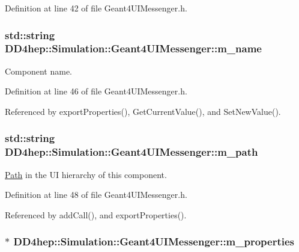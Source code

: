 Definition at line 42 of file Geant4UIMessenger.h.\hypertarget{class_d_d4hep_1_1_simulation_1_1_geant4_u_i_messenger_ab6322440ddac03e9b62f5560c7d11dbf}{
\subsubsection[{m\_\-name}]{\setlength{\rightskip}{0pt plus 5cm}std::string {\bf DD4hep::Simulation::Geant4UIMessenger::m\_\-name}}}
\label{class_d_d4hep_1_1_simulation_1_1_geant4_u_i_messenger_ab6322440ddac03e9b62f5560c7d11dbf}


Component name. 

Definition at line 46 of file Geant4UIMessenger.h.

Referenced by exportProperties(), GetCurrentValue(), and SetNewValue().\hypertarget{class_d_d4hep_1_1_simulation_1_1_geant4_u_i_messenger_a8b314ffb2df2f6268eb13abdad35c1dc}{
\subsubsection[{m\_\-path}]{\setlength{\rightskip}{0pt plus 5cm}std::string {\bf DD4hep::Simulation::Geant4UIMessenger::m\_\-path}}}
\label{class_d_d4hep_1_1_simulation_1_1_geant4_u_i_messenger_a8b314ffb2df2f6268eb13abdad35c1dc}


\hyperlink{class_d_d4hep_1_1_path}{Path} in the UI hierarchy of this component. 

Definition at line 48 of file Geant4UIMessenger.h.

Referenced by addCall(), and exportProperties().\hypertarget{class_d_d4hep_1_1_simulation_1_1_geant4_u_i_messenger_a6be8711d442a1d0031c83f9a5300f1eb}{
\subsubsection[{m\_\-properties}]{$\ast$ {\bf DD4hep::Simulation::Geant4UIMessenger::m\_\-properties}}}
\label{class_d_d4hep_1_1_simulation_1_1_geant4_u_i_messenger_a6be8711d442a1d0031c83f9a5300f1eb}


